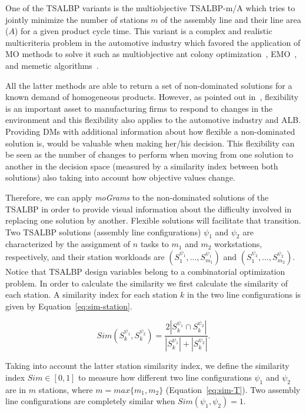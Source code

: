 \documentclass[journal]{IEEEtran}
\begin{document}
One of the TSALBP variants is the multiobjective TSALBP-m/A which tries to jointly minimize the number of stations $m$ of the assembly line and their line area ($A$) for a given product cycle time. This variant is a complex and realistic multicriteria problem in the automotive industry which favored the application of MO methods to solve it such as multiobjective ant colony optimization~\cite{Chica10Ins}, EMO~\cite{Chica11CAIE}, and memetic algorithms~\cite{Chica12EngAppAI}. 

All the latter methods are able to return a set of non-dominated solutions for a known demand of homogeneous products. However, as pointed out in~\cite{Chica13IJPE, Chica16OMEGA}, flexibility is an important asset to manufacturing firms to respond to changes in the environment and this flexibility also applies to the automotive industry and ALB. Providing DMs with additional information about how flexible a non-dominated solution is, would be valuable when making her/his decision. This flexibility can be seen as the number of changes to perform when moving from one solution to another in the decision space (measured by a similarity index between both solutions) also taking into account how  objective values change.



Therefore, we can apply \emph{moGrams} to the non-dominated solutions of the TSALBP in order to provide visual information about the difficulty involved in replacing one solution by another. Flexible solutions will facilitate that transition. Two TSALBP solutions (assembly line configurations) $\psi_1$ and $\psi_2$ are characterized by the assignment of $n$ tasks to $m_1$ and $m_2$ workstations, respectively, and their station workloads are $(S_1^{\psi_1},...,S_{m_1}^{\psi_1})$ and $(S_1^{\psi_2},...,S_{m_2}^{\psi_2})$. Notice that TSALBP design variables belong to a combinatorial optimization problem.
In order to calculate the similarity we first calculate the similarity of each station. A similarity index for each station $k$ in the two line configurations is given by Equation~\ref{eq:sim-station}.

\begin{equation} \label{eq:sim-station}
 Sim(S_k^{\psi_1},S_k^{\psi_2}) = \frac{2|S_k^{\psi_1} \cap S_k^{\psi_2}|}{|S_k^{\psi_1}| + |S_k^{\psi_2}|}.
\end{equation}

Taking into account the latter station similarity index, we define the similarity index $Sim \in [0,1]$ to measure how different two line configurations $\psi_1$ and $\psi_2$ are in $m$ stations, where $m=max\{m_1,m_2\}$ (Equation~\ref{eq:sim-T}). Two assembly line configurations are completely similar when $Sim(\psi_1, \psi_2) = 1$. 
\end{document}
